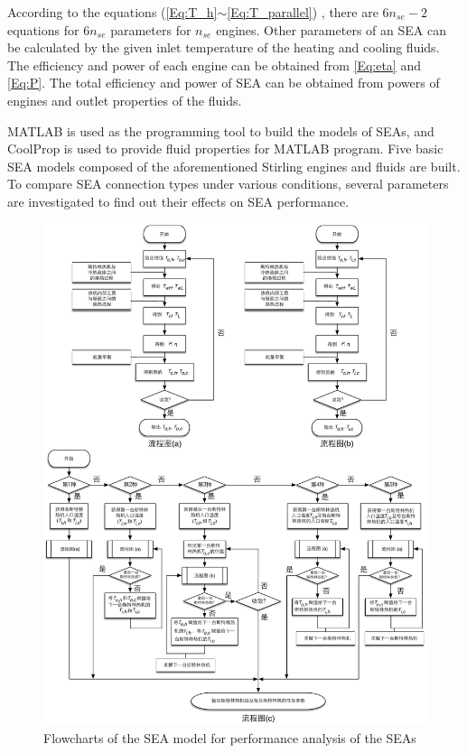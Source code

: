 According to the equations (\autoref{Eq:T_h}$\sim$\autoref{Eq:T_parallel})
, there are $6n_{se} - 2$ equations for $6n_{se}$ parameters for $n_{se}$ engines. Other parameters of an SEA can be calculated by the given inlet temperature of the heating and cooling fluids. The efficiency and power of each engine can be obtained from \autoref{Eq:eta} and \autoref{Eq:P}. The total efficiency and power of SEA can be obtained from powers of engines and outlet properties of the fluids.

MATLAB is used as the programming tool to build the models of SEAs, and CoolProp is used to provide fluid properties for MATLAB program. Five basic SEA models composed of the aforementioned Stirling engines and fluids are built. To compare SEA connection types under various conditions, several parameters are investigated to find out their effects on SEA performance.

\begin{figure}[htbp]
\centering
	\includegraphics[width = 1.0\columnwidth]{fig/FlowChart}
	\caption{Flowcharts of the SEA model for performance analysis of the SEAs}
	\label{fig:Flowchart}

\end{figure}


